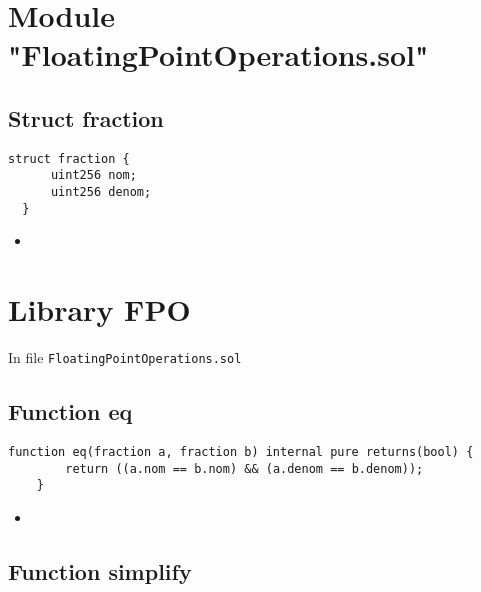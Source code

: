 


\section{Module "FloatingPointOperations.sol"}

\subsection{Struct fraction}

\begin{lstlisting}[firstnumber=3]
  struct fraction {
      uint256 nom;
      uint256 denom;
  }
\end{lstlisting}

\noindent\begin{itemize}
  \item {}
\end{itemize}

\section{Library FPO}

In file {\tt FloatingPointOperations.sol}

\subsection{Function eq}

\begin{lstlisting}[firstnumber=53]
    function eq(fraction a, fraction b) internal pure returns(bool) {
        return ((a.nom == b.nom) && (a.denom == b.denom));
    }
\end{lstlisting}

\noindent\begin{itemize}
  \item {}
\end{itemize}


\subsection{Function simplify}

